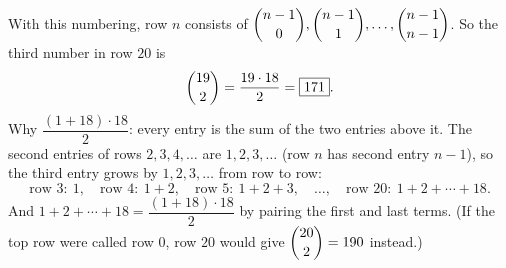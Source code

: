 With this numbering, row $n$ consists of $\dbinom{n-1}{0},\dbinom{n-1}{1},\dots,\dbinom{n-1}{n-1}$. So the third number in row $20$ is
\[
\dbinom{19}{2}=\dfrac{19\cdot18}{2}=\boxed{171}.
\]
Why $\dfrac{(1+18)\cdot18}{2}$: every entry is the sum of the two entries above it. The second entries of rows $2,3,4,\dots$ are $1,2,3,\dots$ (row $n$ has second entry $n-1$), so the third entry grows by $1,2,3,\dots$ from row to row:
\[
\text{row }3:\ 1,\quad\text{row }4:\ 1+2,\quad\text{row }5:\ 1+2+3,\quad\dots,\quad\text{row }20:\ 1+2+\cdots+18 .
\]
And $1+2+\cdots+18=\dfrac{(1+18)\cdot18}{2}$ by pairing the first and last terms. (If the top row were called row $0$, row $20$ would give $\dbinom{20}{2}=190$ instead.)
